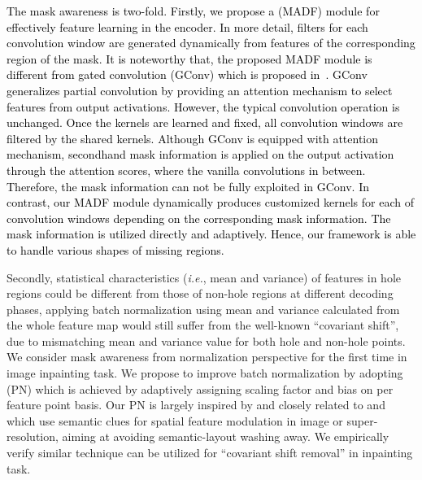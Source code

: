 \documentclass[journal]{IEEEtran}
\begin{document}
\textcolor{black}{
The mask awareness is two-fold. Firstly, we propose a {\color{black}{Mask-Aware Dynamic Filtering}} (MADF) module for effectively feature learning in the encoder. In more detail, filters for each convolution window are generated dynamically from features of the corresponding region of the mask. It is noteworthy that, the proposed MADF module is different from gated convolution (GConv) which is proposed in~\cite{yu2019free}. GConv generalizes partial convolution by providing an attention mechanism to select features from output activations. However, the typical convolution operation is unchanged. Once the kernels are learned and fixed, all convolution windows are filtered by the shared kernels. Although GConv is equipped with attention mechanism, secondhand mask information is applied on the output activation through the attention scores, where the vanilla convolutions {\color{black}{stand}} in between. Therefore, the mask information can not be fully exploited in GConv. In contrast, our MADF module dynamically produces customized kernels for each of convolution windows depending on the corresponding mask information. The mask information is utilized directly and adaptively. Hence, our framework is able to handle various shapes of missing regions.
}

Secondly, statistical characteristics (\textit{i.e.}, mean and variance) of features in hole regions could be different from those of non-hole regions at different decoding phases, applying batch normalization using mean and variance calculated from the whole feature map would still suffer from the well-known ``covariant shift'', due to mismatching mean and variance value for both hole and non-hole points. We consider mask awareness from normalization perspective for the first time in image inpainting task. 
We propose to improve batch normalization by adopting {\color{black}{Point-wise Normalization}} (PN) which is achieved by adaptively assigning scaling factor and bias on per feature point basis. Our PN is largely inspired by and closely related to \cite{park2019semantic} and \cite{wang2018recovering} which use semantic clues for spatial feature modulation in image {\color{black}{synthesis}} or super-resolution, aiming at avoiding semantic-layout washing away. We empirically verify similar technique can be utilized for ``covariant shift removal'' in inpainting task.
\end{document}
